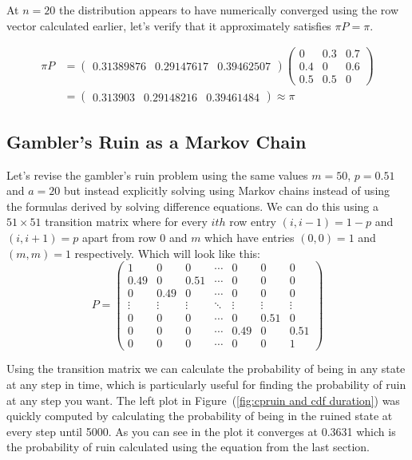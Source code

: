 \documentclass[11pt,a4paper]{article}
\begin{document}
At $n = 20$ the distribution appears to have numerically converged using the row vector calculated earlier, let's verify that it approximately satisfies $\pi P = \pi$.

\begin{align*}
    \pi P &= \begin{pmatrix}
         0.31389876&0.29147617&0.39462507
    \end{pmatrix}
    \begin{pmatrix}
    0&0.3&0.7\\
    0.4&0&0.6\\
    0.5&0.5&0
\end{pmatrix}\\
&=\begin{pmatrix}
    0.313903&0.29148216&0.39461484
\end{pmatrix}\approx\pi
\end{align*}

\subsection{Gambler's Ruin as a Markov Chain}
Let's revise the gambler's ruin problem using the same values $m =50$, $p=0.51$ and $a = 20$ but instead explicitly solving using Markov chains instead of using the formulas derived by solving difference equations. We can do this using a $51\times51$ transition matrix where for every $ith$ row entry $(i,i-1)=1-p$ and $(i,i+1) = p$ apart from row $0$ and $m$ which have entries $(0,0) = 1$ and $(m,m) = 1$ respectively. Which will look like this: \[P = \begin{pmatrix}
    1&0&0&\cdots&0&0&0\\
    0.49&0&0.51&\cdots&0&0&0\\
    0&0.49&0&\cdots&0&0&0\\
    \vdots&\vdots&\vdots&\ddots&\vdots&\vdots&\vdots\\
    0&0&0&\cdots&0&0.51&0\\
    0&0&0&\cdots&0.49&0&0.51\\
    0&0&0&\cdots&0&0&1
\end{pmatrix}\]

Using the transition matrix we can calculate the probability of being in any state at any step in time, which is particularly useful for finding the probability of ruin at any step you want. The left plot in Figure~(\ref{fig:cpruin and cdf duration}) was quickly computed by calculating the probability of being in the ruined state at every step until 5000. As you can see in the plot it converges at 0.3631 which is the probability of ruin calculated using the equation from the last section.
\end{document}
